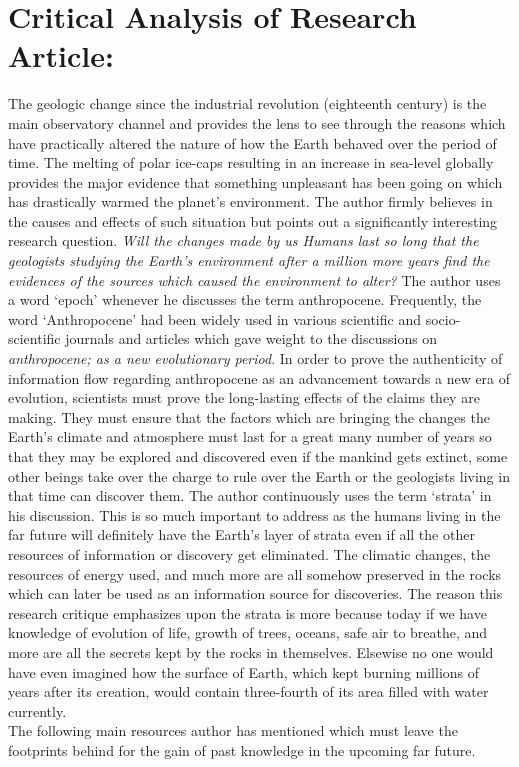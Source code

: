 \documentclass{article}
\begin{document}
\section*{Critical Analysis of Research Article:}
The geologic change since the industrial revolution (eighteenth century) is the main observatory channel and provides the lens to see through the reasons which have practically altered the nature of how the Earth behaved over the period of time. The melting of polar ice-caps resulting in an increase in sea-level globally provides the major evidence that something unpleasant has been going on which has drastically warmed the planet’s environment. The author firmly believes in the causes and effects of such situation but points out a significantly interesting research question. \textit{Will the changes made by us Humans last so long that the geologists studying the Earth’s environment after a million more years find the evidences of the sources which caused the environment to alter?} The author uses a word ‘epoch’ whenever he discusses the term anthropocene. Frequently, the word ‘Anthropocene’ had been widely used in various scientific and socio-scientific journals and articles which gave weight to the discussions on \textit{anthropocene; as a new evolutionary period}. In order to prove the authenticity of information flow regarding anthropocene as an advancement towards a new era of evolution, scientists must prove the long-lasting effects of the claims they are making. They must ensure that the factors which are bringing the changes the Earth’s climate and atmosphere must last for a great many number of years so that they may be explored and discovered even if the mankind gets extinct, some other beings take over the charge to rule over the Earth or the geologists living in that time can discover them. The author continuously uses the term ‘strata’ in his discussion. This is so much important to address as the humans living in the far future will definitely have the Earth’s layer of strata even if all the other resources of information or discovery get eliminated. The climatic changes, the resources of energy used, and much more are all somehow preserved in the rocks which can later be used as an information source for discoveries. The reason this research critique emphasizes upon the strata is more because today if we have knowledge of evolution of life, growth of trees, oceans, safe air to breathe, and more are all the secrets kept by the rocks in themselves. Elsewise no one would have even imagined how the surface of Earth, which kept burning millions of years after its creation, would contain three-fourth of its area filled with water currently. \\
The following main resources author has mentioned which must leave the footprints behind for the gain of past knowledge in the upcoming far future.
\end{document}
